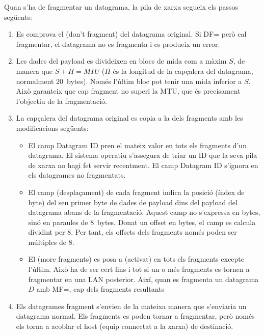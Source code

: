Quan s'ha de fragmentar un datagrama, la pila de xarxa segueix 
els passos següents:
\begin{enumerate}

\item Es comprova el  (don't fragment) del datagrama original. 
    Si DF= però cal fragmentar, el datagrama no es fragmenta 
    i es produeix un error.\\[-0.2cm]

\item Les dades del payload es divideixen en blocs de mida com a màxim $S$, de manera que $S + H = MTU$ 
  ($H$ és la longitud de la capçalera del datagrama, normalment $20$~bytes). Només l'últim bloc
  pot tenir una mida inferior a $S$. Això garanteix que cap fragment no superi la MTU,
  que és precisament l'objectiu de la fragmentació.\\[-0.2cm]
  
\item La capçalera del datagrama original es copia a la dels fragments amb les modificacions següents:
  \begin{itemize}
  \item El camp Datagram ID pren el mateix valor en tots els fragments d'un datagrama. 
    El sistema operatiu s'assegura de triar un ID que la seva pila de xarxa no hagi fet servir recentment.
    El camp Datagram ID s'ignora en els datagrames no fragmentats.\\[-0.3cm]
    
  \item El camp  (desplaçament) de cada fragment indica la posició (índex de byte)
    del seu primer byte de dades de payload dins del payload del datagrama abans de la fragmentació.
    Aquest camp no s'expressa en bytes, sinó en paraules de $8$~bytes.
    Donat un offset en bytes, el camp  es calcula dividint per $8$.
    Per tant, els offsets dels fragments només poden ser múltiples de $8$.\\[-0.3cm]
    
  \item El  (more fragments) es posa a  (activat)
    en tots els fragments excepte l'últim. Això ha de ser cert fins i tot si un o més
    fragments es tornen a fragmentar en una LAN posterior. Així, quan es fragmenta un 
    datagrama $D$ amb MF=, cap dels fragments resultants\\[-0.2cm]
  \end{itemize}
  
\item Els datagrames fragment s'envien de la mateixa manera que s'enviaria un datagrama normal.
  Els fragments es poden tornar a fragmentar, però només els torna a acoblar el host (equip connectat a la xarxa) de destinació.
  
\end{enumerate}


